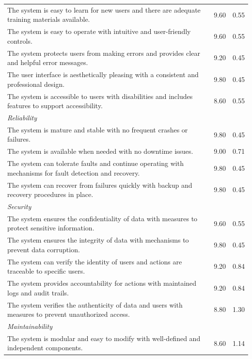 \begin{appendices}
\begin{centerappendixtitle}
\begin{spacing}{1.3}
\begin{longtable}{p{12cm}cc}
			  The system is easy to learn for new users and there are adequate training materials available.
			  & 9.60 & 0.55  \\
			  The system is easy to operate with intuitive and user-friendly controls.
			  & 9.60 & 0.55  \\
			  The system protects users from making errors and provides clear and helpful error messages.
			  & 9.20 & 0.45  \\
			  The user interface is aesthetically pleasing with a consistent and professional design.
			  & 9.80 & 0.45  \\
			  The system is accessible to users with disabilities and includes features to support accessibility.
			  & 8.60 & 0.55  \\ \hline
			  \multicolumn{2}{l}{\textit{Reliability}} \\
			  The system is mature and stable with no frequent crashes or failures.
			  & 9.80 & 0.45  \\
			  The system is available when needed with no downtime issues.
			  & 9.00 & 0.71  \\
			  The system can tolerate faults and continue operating with mechanisms for fault detection and recovery.
			  & 9.80 & 0.45  \\
			  The system can recover from failures quickly with backup and recovery procedures in place.
			  & 9.80  & 0.45\\ \hline
			  \multicolumn{2}{l}{\textit{Security}} \\
			  The system ensures the confidentiality of data with measures to protect sensitive information.
			  & 9.60 & 0.55  \\
			  The system ensures the integrity of data with mechanisms to prevent data corruption.
			  & 9.80 & 0.45  \\
			  The system can verify the identity of users and actions are traceable to specific users.
			  & 9.20 & 0.84  \\
			  The system provides accountability for actions with maintained logs and audit trails.
			  & 9.20 & 0.84  \\
			  The system verifies the authenticity of data and users with measures to prevent unauthorized access.
			  & 8.80 & 1.30  \\ \hline
			  \multicolumn{2}{l}{\textit{Maintainability}} \\
			  The system is modular and easy to modify with well-defined and independent components.
			  & 8.60 & 1.14  \\

\end{longtable}
\end{spacing}
\end{centerappendixtitle}
\end{appendices}
